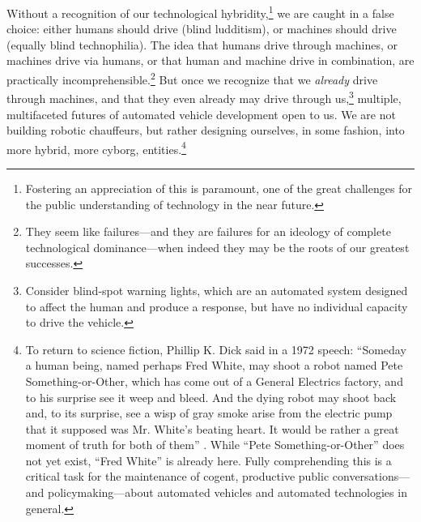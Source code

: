 
Without a recognition of our technological
hybridity,\footnote{Fostering an appreciation of this is paramount, one of the
  great challenges for the public understanding 
of technology in the near future.} we are caught in a false choice:
either humans should drive (blind ludditism), or machines should 
drive (equally blind technophilia). The idea that humans drive through
machines, or machines drive 
via humans, or that human and machine drive in combination, are
practically incomprehensible.\footnote{They seem like failures---and they are
failures for an ideology of complete technological dominance---when
indeed they may be the roots of our greatest successes.} But once we
recognize that we \emph{already} drive through machines, and that they
even already may drive through us,\footnote{Consider blind-spot
warning lights, which are an automated system designed to affect the
human and produce a response, but have no individual capacity to drive
the vehicle.} multiple, multifaceted futures of automated vehicle
development open to us. We are not building robotic
chauffeurs, but rather designing ourselves, in some fashion, into more
hybrid, more cyborg, entities.\footnote{To return to science fiction, Phillip K. Dick said in
a 1972 speech: ``Someday a human being, named perhaps Fred White, may shoot a robot
named Pete Something-or-Other, which has come out of a General
Electrics factory, and to his surprise see it weep and bleed. And the
dying robot may shoot back and, to its surprise, see a wisp of gray
smoke arise from the electric pump that it supposed was Mr. White's
beating heart. It would be rather a great moment of truth for both of
them'' \cite{androidHuman}.
While ``Pete Something-or-Other'' does not yet exist, ``Fred White''
is already here. Fully comprehending this is a critical task for the
maintenance of cogent, productive public conversations---and
policymaking---about automated vehicles and automated technologies in general.}



